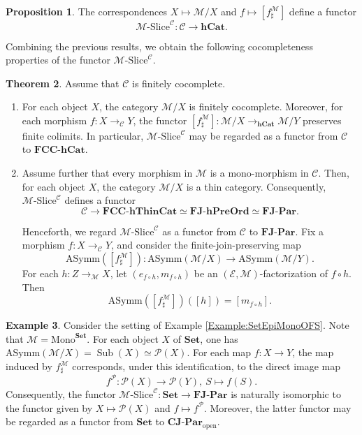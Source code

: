\documentclass[12pt, a4paper]{amsart}
\theoremstyle{definition}
\newtheorem{theorem}{Theorem}[section]
\newtheorem{proposition}[theorem]{Proposition}
\newtheorem{example}[theorem]{Example}
\newcommand{\open}{\mathop{\mathrm{open}}\nolimits}
\newcommand{\Mono}{\mathrm{Mono}}
\newcommand{\AS}{\mathrm{ASymm}}
\newcommand{\CompJoinParOrd}{\mathbf{CJ}\text{-}\mathbf{Par}}
\newcommand{\FinJoinParOrd}{\mathbf{FJ}\text{-}\mathbf{Par}}
\newcommand{\hFinJoinPreOrd}{\mathbf{FJ}\text{-}\mathbf{hPreOrd}}
\newcommand{\FCChCat}{\mathbf{FCC}\text{-}\mathbf{hCat}}
\newcommand{\Set}{{\mathbf{Set}}}
\newcommand{\hCat}{{\mathbf{hCat}}}
\newcommand{\FCChThinCat}{{\mathbf{FCC}\text{-}\mathbf{hThinCat}}}
\newcommand{\MSlice}{\mathcal{M}\text{-}\mathrm{Slice}^\mathcal{C}}
\newcommand{\Sub}{\operatorname{Sub}}
\begin{document}
\begin{proposition}\label{proposition:functfM}
The correspondences
$X\mapsto\mathcal{M}/X$
and
$f\mapsto[f_\sharp^{\mathcal{M}}]$
define a functor
\[
\MSlice:\mathcal{C}\to\hCat.
\]    
\end{proposition}


Combining the previous results, we obtain the following cocompleteness 
properties of the functor $\MSlice$.

\begin{theorem}\label{theorem:fMFCC}
Assume that $\mathcal{C}$ is finitely cocomplete.
\begin{enumerate}
\item \label{item:fMFCC:fMsharpFCCpreserve}
For each object $X$, the category $\mathcal{M}/X$ is finitely cocomplete.
Moreover, for each morphism
$f:X\rightarrow_{\mathcal{C}}Y$,
the functor
$[f_\sharp^{\mathcal{M}}]:
\mathcal{M}/X \rightarrow_{\hCat}\mathcal{M}/Y$
preserves finite colimits.
In particular, $\MSlice$ may be regarded as a functor from
$\mathcal{C}$ to $\FCChCat$.

\item \label{item:fMFCC:Mono}
Assume further that every morphism in $\mathcal{M}$ is a mono-morphism in $\mathcal{C}$. 
Then, for each object $X$, the category $\mathcal{M}/X$ is a thin category.
Consequently, $\MSlice$ defines a functor
\[
\mathcal{C}
\longrightarrow
\FCChThinCat
\simeq
\hFinJoinPreOrd
\simeq
\FinJoinParOrd.
\]

Henceforth, we regard $\MSlice$ as a functor from $\mathcal{C}$ to
$\FinJoinParOrd$.
Fix a morphism
$f:X\rightarrow_{\mathcal{C}}Y$,
and consider the finite-join-preserving map
\[
\AS([f_\sharp^{\mathcal{M}}]):
\AS(\mathcal{M}/X)
\rightarrow
\AS(\mathcal{M}/Y).
\]
For each
$h:Z\rightarrow_{\mathcal{M}}X$,
let
$(e_{f\circ h},m_{f\circ h})$
be an $(\mathcal{E},\mathcal{M})$-factorization of
$f\circ h$.
Then
\[
\AS([f_\sharp^{\mathcal{M}}])([h])
=
[m_{f\circ h}].
\]
\end{enumerate}
\end{theorem}

\begin{example}
Consider the setting of Example \ref{Example:SetEpiMonoOFS}. Note that $\mathcal{M} = \Mono^{\Set}$. For each object $X$ of $\Set$, one has $\AS(\mathcal{M}/X) = \Sub(X) \simeq \mathcal{P}(X)$. For each map $f : X \rightarrow Y$, the map induced by $f^\mathcal{M}_\sharp$ corresponds, under this identification, to the direct image map
\[
f^\mathcal{P} : \mathcal{P}(X) \rightarrow \mathcal{P}(Y), ~ S \mapsto f(S).
\]
Consequently, the functor $\MSlice : \Set \rightarrow \FinJoinParOrd$ is naturally isomorphic to the functor given by $X \mapsto \mathcal{P}(X)$ and $f \mapsto f^{\mathcal{P}}$. Moreover, the latter functor may be regarded as a functor from $\Set$ to $\CompJoinParOrd_{\open}$.
\end{example}
\end{document}
